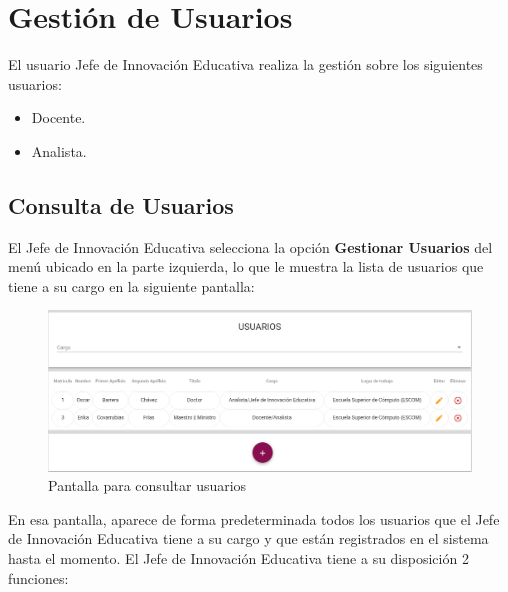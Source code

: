 \clearpage
\section{Gestión de Usuarios}

    El usuario  Jefe de Innovación Educativa realiza la gestión sobre los siguientes usuarios:
    \begin{itemize}
        \item Docente.
        \item Analista.
    \end{itemize}
  \subsection{Consulta de Usuarios}

El Jefe de Innovación Educativa selecciona  la opción \textbf{Gestionar Usuarios} del menú ubicado en la parte izquierda, lo que le muestra la lista de usuarios que tiene a su cargo en la siguiente pantalla:

\begin{figure}[H]
	\centering
	\hypertarget{consultarUs-JIE}{\includegraphics[width=0.6\linewidth]{images/SP5/Consultar-Usuario}}
	\caption{Pantalla para consultar usuarios}
	\label{consultarrh-JIE}
\end{figure}

En esa pantalla, aparece de forma predeterminada todos los usuarios que el Jefe de Innovación Educativa tiene a su cargo y que están registrados en el sistema hasta el momento. El Jefe de Innovación Educativa tiene a su disposición 2 funciones:

